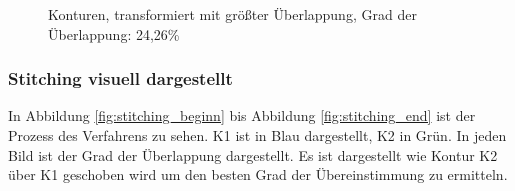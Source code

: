 \documentclass[../main.tex]{subfiles}
\begin{document}
\begin{figure}[h]
\begin{minipage}{0.49\textwidth}
        \caption{Konturen, transformiert mit größter Überlappung, 
        Grad der Überlappung: 24,26\%}
        \label{fig:after_matching}
    \end{minipage}\hfill
\end{figure}

\subsubsection*{Stitching visuell dargestellt}

In Abbildung \ref{fig:stitching_beginn} bis Abbildung \ref{fig:stitching_end}
ist der Prozess des Verfahrens zu sehen. K1 ist in Blau dargestellt, K2 in Grün.
In jeden Bild ist der Grad der Überlappung dargestellt. Es ist dargestellt wie 
Kontur K2 über K1 geschoben wird um den besten Grad der Übereinstimmung zu ermitteln. 
\end{document}
